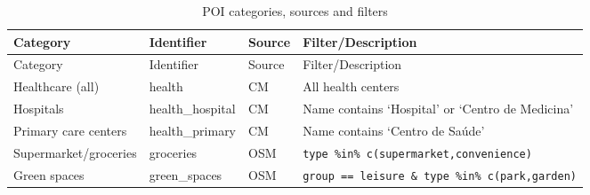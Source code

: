 \documentclass[
  authoryear,
  review,
  1p]{elsarticle}
\begin{document}
\begin{longtable}[]{@{}
  >{\raggedright\arraybackslash}p{}
  >{\raggedright\arraybackslash}p{}
  >{\raggedright\arraybackslash}p{}
  >{\raggedright\arraybackslash}p{}@{}}
\caption{POI categories, sources and
filters}\label{tbl-poi_categories}\tabularnewline
\toprule\noalign{}
\begin{minipage}[b]{\linewidth}\raggedright
Category
\end{minipage} & \begin{minipage}[b]{\linewidth}\raggedright
Identifier
\end{minipage} & \begin{minipage}[b]{\linewidth}\raggedright
Source
\end{minipage} & \begin{minipage}[b]{\linewidth}\raggedright
Filter/Description
\end{minipage} \\
\midrule\noalign{}
\endfirsthead
\toprule\noalign{}
\begin{minipage}[b]{\linewidth}\raggedright
Category
\end{minipage} & \begin{minipage}[b]{\linewidth}\raggedright
Identifier
\end{minipage} & \begin{minipage}[b]{\linewidth}\raggedright
Source
\end{minipage} & \begin{minipage}[b]{\linewidth}\raggedright
Filter/Description
\end{minipage} \\
\midrule\noalign{}
\endhead
\bottomrule\noalign{}
\endlastfoot
Healthcare (all) & health & CM & All health centers \\
Hospitals & health\_hospital & CM & Name contains `Hospital' or `Centro
de Medicina' \\
Primary care centers & health\_primary & CM & Name contains `Centro de
Saúde' \\
Supermarket/groceries & groceries & OSM &
\texttt{type\ \%in\%\ c(\textquotesingle{}supermarket\textquotesingle{},\textquotesingle{}convenience\textquotesingle{})} \\
Green spaces & green\_spaces & OSM &
\texttt{group\ ==\ \textquotesingle{}leisure\textquotesingle{}\ \&\ type\ \%in\%\ c(\textquotesingle{}park\textquotesingle{},\textquotesingle{}garden\textquotesingle{})} \\

\end{longtable}
\end{document}
